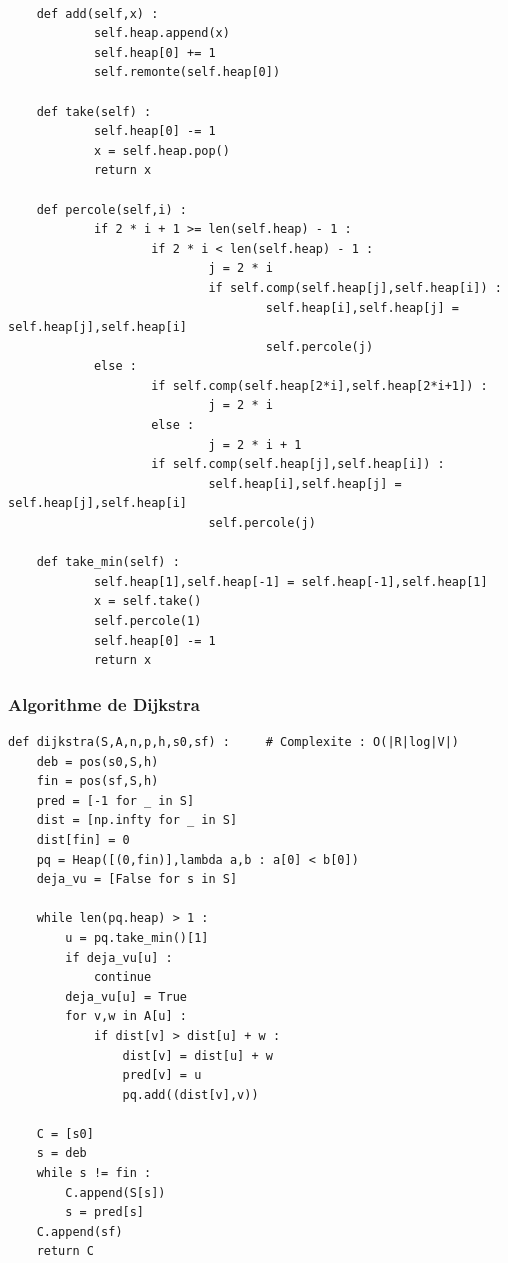 \documentclass{beamer}[11pt]
\begin{document}
		\begin{frame}[containsverbatim]
\begin{lstlisting}[basicstyle=\tiny]

	def add(self,x) :
			self.heap.append(x)
			self.heap[0] += 1
			self.remonte(self.heap[0])

	def take(self) :
			self.heap[0] -= 1
			x = self.heap.pop()
			return x

	def percole(self,i) :
			if 2 * i + 1 >= len(self.heap) - 1 :
					if 2 * i < len(self.heap) - 1 :
							j = 2 * i
							if self.comp(self.heap[j],self.heap[i]) :
									self.heap[i],self.heap[j] = self.heap[j],self.heap[i]
									self.percole(j)
			else :
					if self.comp(self.heap[2*i],self.heap[2*i+1]) :
							j = 2 * i
					else :
							j = 2 * i + 1
					if self.comp(self.heap[j],self.heap[i]) :
							self.heap[i],self.heap[j] = self.heap[j],self.heap[i]
							self.percole(j)

	def take_min(self) :
			self.heap[1],self.heap[-1] = self.heap[-1],self.heap[1]
			x = self.take()
			self.percole(1)
			self.heap[0] -= 1
			return x
\end{lstlisting}
		\end{frame}

		\begin{frame}[containsverbatim]
			\frametitle{Algorithme de Dijkstra}
\begin{lstlisting}
def dijkstra(S,A,n,p,h,s0,sf) :		# Complexite : O(|R|log|V|)
    deb = pos(s0,S,h)
    fin = pos(sf,S,h)
    pred = [-1 for _ in S]
    dist = [np.infty for _ in S]
    dist[fin] = 0
    pq = Heap([(0,fin)],lambda a,b : a[0] < b[0])
    deja_vu = [False for s in S]

    while len(pq.heap) > 1 :
        u = pq.take_min()[1]
        if deja_vu[u] :
            continue
        deja_vu[u] = True
        for v,w in A[u] :
            if dist[v] > dist[u] + w :
                dist[v] = dist[u] + w
                pred[v] = u
                pq.add((dist[v],v))

    C = [s0]
    s = deb
    while s != fin :
        C.append(S[s])
        s = pred[s]
    C.append(sf)
    return C
\end{lstlisting}
		\end{frame}
\end{document}
